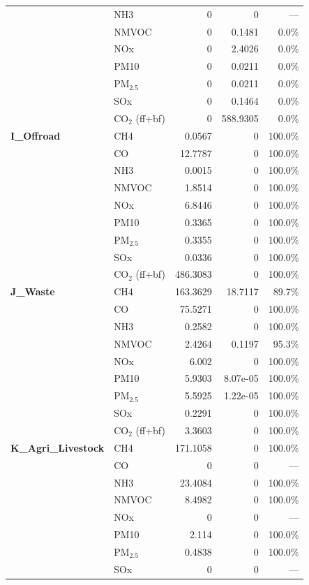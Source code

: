 \begin{longtable}{@{}llrrr@{}}
 & NH3 & 0 & 0 & --- \\
 & NMVOC & 0 & 0.1481 & 0.0\% \\
 & NOx & 0 & 2.4026 & 0.0\% \\
 & PM10 & 0 & 0.0211 & 0.0\% \\
 & PM$_{2.5}$ & 0 & 0.0211 & 0.0\% \\
 & SOx & 0 & 0.1464 & 0.0\% \\
 & CO$_2$ (ff+bf) & 0 & 588.9305 & 0.0\% \\
 \midrule
\addlinespace[2pt]
\textbf{I\_Offroad} & CH4 & 0.0567 & 0 & 100.0\% \\
 & CO & 12.7787 & 0 & 100.0\% \\
 & NH3 & 0.0015 & 0 & 100.0\% \\
 & NMVOC & 1.8514 & 0 & 100.0\% \\
 & NOx & 6.8446 & 0 & 100.0\% \\
 & PM10 & 0.3365 & 0 & 100.0\% \\
 & PM$_{2.5}$ & 0.3355 & 0 & 100.0\% \\
 & SOx & 0.0336 & 0 & 100.0\% \\
 & CO$_2$ (ff+bf) & 486.3083 & 0 & 100.0\% \\
 \midrule
\addlinespace[2pt]
\textbf{J\_Waste} & CH4 & 163.3629 & 18.7117 & 89.7\% \\
 & CO & 75.5271 & 0 & 100.0\% \\
 & NH3 & 0.2582 & 0 & 100.0\% \\
 & NMVOC & 2.4264 & 0.1197 & 95.3\% \\
 & NOx & 6.002 & 0 & 100.0\% \\
 & PM10 & 5.9303 & 8.07e-05 & 100.0\% \\
 & PM$_{2.5}$ & 5.5925 & 1.22e-05 & 100.0\% \\
 & SOx & 0.2291 & 0 & 100.0\% \\
 & CO$_2$ (ff+bf) & 3.3603 & 0 & 100.0\% \\
 \midrule
\addlinespace[2pt]
\textbf{K\_Agri\_Livestock} & CH4 & 171.1058 & 0 & 100.0\% \\
 & CO & 0 & 0 & --- \\
 & NH3 & 23.4084 & 0 & 100.0\% \\
 & NMVOC & 8.4982 & 0 & 100.0\% \\
 & NOx & 0 & 0 & --- \\
 & PM10 & 2.114 & 0 & 100.0\% \\
 & PM$_{2.5}$ & 0.4838 & 0 & 100.0\% \\
 & SOx & 0 & 0 & --- \\

\end{longtable}
